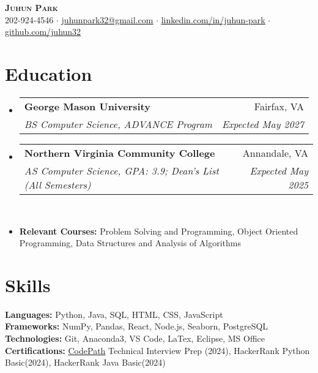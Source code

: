 \documentclass[letterpaper,11pt]{article}
\makeatletter
\newcommand{\resumeItem}[1]{
  \item\small{
    {#1 \vspace{-3pt}}
  }
}
\newcommand{\resumeSubheading}[4]{
  \vspace{-2pt}\item
    \begin{tabular*}{0.97\textwidth}[t]{l@{\extracolsep{\fill}}r@{\hspace{-0.2in}}}
        \textbf{#1} & #2 \\
        \textit{\small#3} & \textit{\small #4} \\
    \end{tabular*}\vspace{-1pt}
}
\newcommand{\resumeSubHeadingListStart}{\begin{itemize}[leftmargin=0.00in, rightmargin=-0.2in, label={}]}
\newcommand{\resumeSubHeadingListEnd}{\end{itemize}}
\makeatother
\begin{document}
\begin{center}
    \textbf{\Huge \scshape {Juhun Park}} \\ \vspace{1pt}
    \small 202-924-4546 $\cdot$ 
    \href{mailto:riann3207@gmail.com}{\underline{juhunpark32@gmail.com}} $\cdot$
    \href{https://linkedin.com/in/juhun-park}{\underline{linkedin.com/in/juhun-park}} $\cdot$
    \href{https://github.com/juhun32}{\underline{github.com/juhun32}} \\
\end{center}


\section{Education}
    \resumeSubHeadingListStart
        \resumeSubheading
            {George Mason University}{Fairfax, VA}
            {BS Computer Science, ADVANCE Program}{Expected May 2027}

        \resumeSubheading
            {Northern Virginia Community College}{Annandale, VA}
            {AS Computer Science, GPA: 3.9; Dean's List (All Semesters)}{Expected May 2025} \\
        
        \resumeItem{\textbf{Relevant Courses: }{Problem Solving and Programming, Object Oriented Programming, Data Structures and Analysis of Algorithms}}
    \resumeSubHeadingListEnd

\section{Skills}
    \vspace*{3pt}
    \begin{itemize}[leftmargin=0in, label={}]
        \small{\item{
            \textbf{Languages: }{Python, Java, SQL, HTML, CSS, JavaScript} \\
            \textbf{Frameworks: }{NumPy, Pandas, React, Node.js, Seaborn, PostgreSQL} \\
            \textbf{Technologies: }{Git, Anaconda3, VS Code, LaTex, Eclipse, MS Office} \\
            \textbf{Certifications: }{\href{https://www.codepath.org/}{\underline{CodePath}} Technical Interview Prep (2024), HackerRank Python Basic(2024), HackerRank Java Basic(2024)} \\
        }}
    \end{itemize}
\end{document}
